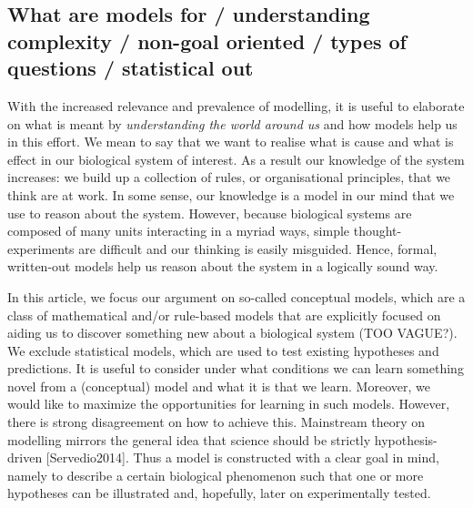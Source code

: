 \subsection{What are models for / understanding complexity / non-goal oriented / types of questions / statistical out}

With the increased relevance and prevalence of modelling, it is useful to elaborate on what is meant by \emph{understanding the world around us} and how models help us in this effort. We mean to say that we want to realise what is cause and what is effect in our biological system of interest. As a result our knowledge of the system increases: we build up a collection of rules, or organisational principles, that we think are at work. In some sense, our knowledge is a model in our mind that we use to reason about the system. However, because biological systems are composed of many units interacting in a myriad ways, simple thought-experiments are difficult and our thinking is easily misguided. Hence, formal, written-out models help us reason about the system in a logically sound way.

In this article, we focus our argument on so-called conceptual models, which are a class of mathematical and/or rule-based models that are explicitly focused on aiding us to discover something new about a biological system (TOO VAGUE?). We exclude statistical models, which are used to test existing hypotheses and predictions. It is useful to consider under what conditions we can learn something novel from a (conceptual) model and what it is that we learn. Moreover, we would like to maximize the opportunities for learning in such models. However, there is strong disagreement on how to achieve this. Mainstream theory on modelling mirrors the general idea that science should be strictly hypothesis-driven [Servedio2014]. Thus a model is constructed with a clear goal in mind, namely to describe a certain biological phenomenon such that one or more hypotheses can be illustrated and, hopefully, later on experimentally tested.
